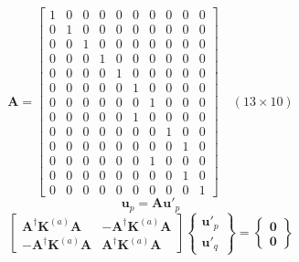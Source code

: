 \documentclass[11pt]{article} %
\begin{document}
\begin{equation}
	\mathbf{A} =  \left[ \begin{array}{cccccccccc} 1 & 0 & 0 & 0 & 0 & 0 & 0 & 0 & 0 & 0 \\ 0 & 1 & 0 & 0 & 0 & 0 & 0 & 0 & 0 & 0 \\ 0 & 0 & 1 & 0 & 0 & 0 & 0 & 0 & 0 & 0 \\ 0 & 0 & 0 & 1 & 0 & 0 & 0 & 0 & 0 & 0 \\ 0 & 0 & 0 & 0 & 1 & 0 & 0 & 0 & 0 & 0 \\ 0 & 0 & 0 & 0 & 0 & 1 & 0 & 0 & 0 & 0 \\ 0 & 0 & 0 & 0 & 0 & 0 & 1 & 0 & 0 & 0 \\ 0 & 0 & 0 & 0 & 0 & 1 & 0 & 0 & 0 & 0 \\ 0 & 0 & 0 & 0 & 0 & 0 & 0 & 1 & 0 & 0 \\ 0 & 0 & 0 & 0 & 0 & 0 & 0 & 0 & 1 & 0 \\ 0 & 0 & 0 & 0 & 0 & 0 & 1 & 0 & 0 & 0 \\ 0 & 0 & 0 & 0 & 0 & 0 & 0 & 0 & 1 & 0 \\ 0 & 0 & 0 & 0 & 0 & 0 & 0 & 0 & 0 & 1 \end{array} \right] \quad (13 \times 10)
\end{equation}
\begin{equation}
	\mathbf{u}_p = \mathbf{A} \mathbf{u}'_p
\end{equation}
\begin{equation}
	\left[ \begin{array}{cc} \mathbf{A}^{\dagger} \mathbf{K}^{(a)} \mathbf{A} & - \mathbf{A}^{\dagger} \mathbf{K}^{(a)} \mathbf{A} \\ - \mathbf{A}^{\dagger} \mathbf{K}^{(a)} \mathbf{A} & \mathbf{A}^{\dagger} \mathbf{K}^{(a)} \mathbf{A} \end{array} \right] \left\{ \begin{array}{c} \mathbf{u}'_p \\ \mathbf{u}'_q \end{array} \right\} = \left\{ \begin{array}{c} \mathbf{0} \\ \mathbf{0} \end{array} \right\}
\end{equation}
\end{document}
